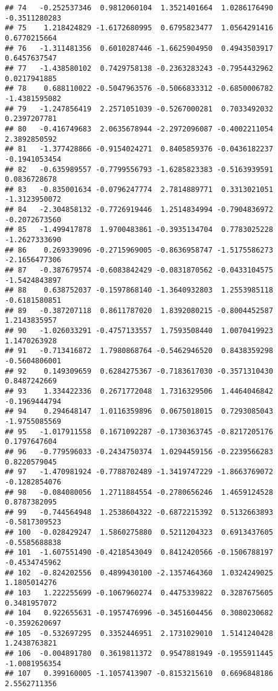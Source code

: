 \documentclass[
]{article}
\begin{document}
\begin{verbatim}
## 74   -0.252537346  0.9812060104  1.3521401664  1.0286176490 -0.3511280283
## 75    1.218424829 -1.6172680995  0.6795823477  1.0564291416  0.6770215664
## 76   -1.311481356  0.6010287446 -1.6625904950  0.4943503917  0.6457637547
## 77   -1.438580102  0.7429758138 -0.2363283243 -0.7954432962  0.0217941885
## 78    0.688110022 -0.5047963576 -0.5066833312 -0.6850006782 -1.4381595082
## 79   -1.247856419  2.2571051039 -0.5267000281  0.7033492032  0.2397207781
## 80   -0.416749683  2.0635678944 -2.2972096087 -0.4002211054  2.3892850592
## 81   -1.377428866 -0.9154024271  0.8405859376 -0.0436182237 -0.1941053454
## 82   -0.635989557 -0.7799556793 -1.6285823383 -0.5163939591  0.0836728678
## 83   -0.835001634 -0.0796247774  2.7814889771  0.3313021051 -1.3123950072
## 84   -2.304858132 -0.7726919446  1.2514834994 -0.7904836972 -0.2072673560
## 85   -1.499417878  1.9700483861 -0.3935134704  0.7783025228 -1.2627333690
## 86    0.269339096 -0.2715969005 -0.8636958747 -1.5175586273 -2.1656477306
## 87   -0.387679574 -0.6083842429 -0.0831870562 -0.0433104575 -1.5424843897
## 88    0.638752037 -0.1597868140 -1.3640932803  1.2553985118 -0.6181580851
## 89   -0.387207118  0.8611787020  1.8392080215 -0.8004452587  1.2143835957
## 90   -1.026033291 -0.4757133557  1.7593508440  1.0070419923  1.1470263928
## 91   -0.713416872  1.7980868764 -0.5462946520  0.8438359298 -0.5604806001
## 92    0.149309659  0.6284275367 -0.7183617030 -0.3571310430  0.8487242669
## 93    1.334422336  0.2671772048  1.7316329506  1.4464046842 -0.1969444794
## 94    0.294648147  1.0116359896  0.0675018015  0.7293085043 -1.9755085569
## 95   -1.017911558  0.1671092287 -0.1730363745 -0.8217205176  0.1797647604
## 96   -0.779596033 -0.2434750374  1.0294459156 -0.2239566283  0.8220579045
## 97   -1.470981924 -0.7788702489 -1.3419747229 -1.8663769072 -0.1282854076
## 98   -0.084080056  1.2711884554 -0.2780656246  1.4659124528  0.8787382095
## 99   -0.744564948  1.2538604322 -0.6872215392  0.5132663893 -0.5817309523
## 100  -0.028429247  1.5860275880  0.5211204323  0.6913437605 -0.5585688838
## 101  -1.607551490 -0.4218543049  0.8412420566 -0.1506788197 -0.4534745962
## 102  -0.824202556  0.4899430100 -2.1357464360  1.0324249025  1.1805014276
## 103   1.222255699 -0.1067960274  0.4475339822  0.3287675605  0.3481957072
## 104   0.922655631 -0.1957476996 -0.3451604456  0.3080230682 -0.3592620697
## 105  -0.532697295  0.3352446951  2.1731029010  1.5141240428  1.2438763821
## 106  -0.004891780  0.3619811372  0.9547881949 -0.1955911445 -1.0081956354
## 107   0.399160005 -1.1057413907 -0.8153215610  0.6696848186  2.5562711356

\end{verbatim}
\end{document}
